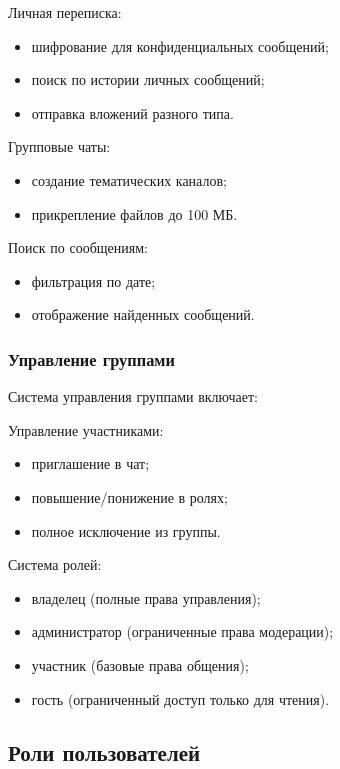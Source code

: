 Личная переписка:

	\begin{itemize}
		\item шифрование для конфиденциальных сообщений;
		\item поиск по истории личных сообщений;
		\item отправка вложений разного типа.
	\end{itemize}
	
Групповые чаты:

	\begin{itemize}
		\item создание тематических каналов;
		\item прикрепление файлов до 100 МБ.
	\end{itemize}
	
Поиск по сообщениям:

	\begin{itemize}
		\item фильтрация по дате;
		\item отображение найденных сообщений.
	\end{itemize}
	
\subsubsection{Управление группами}

Система управления группами включает:
	
Управление участниками:

	\begin{itemize}
		\item приглашение в чат;
		\item повышение/понижение в ролях;
		\item полное исключение из группы.
	\end{itemize}
	
Система ролей:

	\begin{itemize}
		\item владелец (полные права управления);
		\item администратор (ограниченные права модерации);
		\item участник (базовые права общения);
		\item гость (ограниченный доступ только для чтения).
	\end{itemize}
	

\subsection{Роли пользователей}

